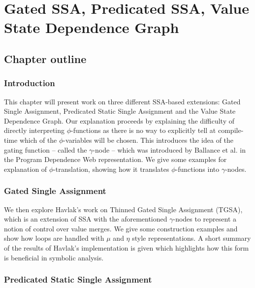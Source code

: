 \applynumberofpages\chapter{Gated SSA, Predicated SSA, Value State Dependence Graph }


\section*{Chapter outline}

\subsection*{Introduction}

This chapter will present work on three different SSA-based extensions: Gated Single Assignment, Predicated Static Single Assignment and the Value State Dependence Graph. Our explanation proceeds by explaining the difficulty of directly interpreting $\phi$-functions as there is no way to explicitly tell at compile-time which of the $\phi$-variables will be chosen. This introduces the idea of the gating function -- called the $\gamma$-node -- which was introduced by Ballance et al. in the Program Dependence Web\cite{207115} representation. We give some examples for explanation of $\phi$-translation, showing how it translates $\phi$-functions into $\gamma$-nodes.

\subsection*{Gated Single Assignment}

We then explore Havlak's work\cite{Havlak93constructionof} on Thinned Gated Single Assignment (TGSA), which is an extension of SSA with the aforementioned $\gamma$-nodes to represent a notion of control over value merges. We give some construction examples and show how loops are handled with $\mu$ and $\eta$ style representations. A short summary of the results of Havlak's implementation is given which highlights how this form is beneficial in symbolic analysis.

\subsection*{Predicated Static Single Assignment}

